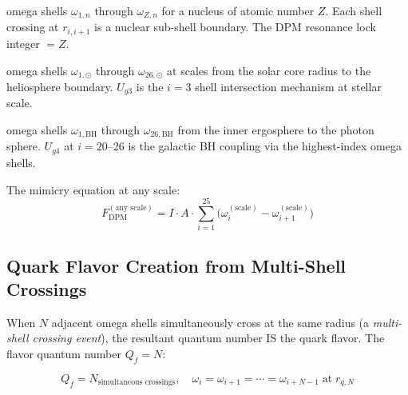 \documentclass[12pt,a4paper]{article}
\begin{document}
\begin{description}[noitemsep]
  \item[Atomic nucleus:] omega shells $\omega_{1,n}$ through $\omega_{Z,n}$
    for a nucleus of atomic number $Z$.  Each shell crossing at $r_{i,i+1}$ is a
    nuclear sub-shell boundary.  The DPM resonance lock integer $= Z$.
  \item[Stellar nucleus:] omega shells $\omega_{1,\odot}$ through
    $\omega_{26,\odot}$ at scales from the solar core radius to the heliosphere
    boundary.  $U_{g3}$ is the $i=3$ shell intersection mechanism at stellar scale.
  \item[Black hole nucleus:] omega shells $\omega_{1,\text{BH}}$ through
    $\omega_{26,\text{BH}}$ from the inner ergosphere to the photon sphere.
    $U_{g4}$ at $i=20$--$26$ is the galactic BH coupling via the highest-index omega
    shells.
\end{description}

The mimicry equation at any scale:
\begin{equation}
  F_{\text{DPM}}^{(\text{any scale})} = I \cdot A
    \cdot \sum_{i=1}^{25}\bigl(\omega_i^{(\text{scale})} - \omega_{i+1}^{(\text{scale})}\bigr)
  \label{eq:dpm_universal}
\end{equation}

\subsection{Quark Flavor Creation from Multi-Shell Crossings}
\label{sec:quarks}

When $N$ adjacent omega shells simultaneously cross at the same radius
(a \emph{multi-shell crossing event}), the resultant quantum number IS the quark
flavor.  The flavor quantum number $Q_f = N$:

\begin{equation}
  Q_f = N_{\text{simultaneous crossings}},
  \quad
  \omega_i = \omega_{i+1} = \cdots = \omega_{i+N-1}
  \;\text{at}\; r_{q,N}
  \label{eq:quark_flavor_condition}
\end{equation}
\end{document}

